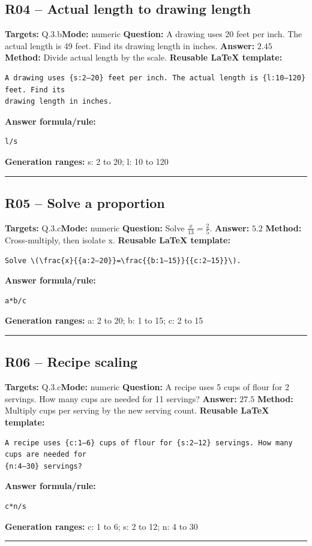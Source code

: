\documentclass[11pt]{article}
\begin{document}
\subsection{R04 -- Actual length to drawing length}
\textbf{Targets:} Q.3.b\quad\textbf{Mode:} numeric
\textbf{Question:} A drawing uses 20 feet per inch. The actual length is 49 feet. Find its drawing length in inches.
\textbf{Answer:} \(2.45\)
\textbf{Method:} Divide actual length by the scale.
\textbf{Reusable LaTeX template:}
\begin{verbatim}
A drawing uses {s:2–20} feet per inch. The actual length is {l:10–120} feet. Find its
drawing length in inches.
\end{verbatim}
\textbf{Answer formula/rule:}
\begin{verbatim}
l/s
\end{verbatim}
\textbf{Generation ranges:} s: 2 to 20; l: 10 to 120
\medskip\hrule\medskip
\subsection{R05 -- Solve a proportion}
\textbf{Targets:} Q.3.c\quad\textbf{Mode:} numeric
\textbf{Question:} Solve \(\frac{x}{13}=\frac{2}{5}\).
\textbf{Answer:} \(5.2\)
\textbf{Method:} Cross-multiply, then isolate x.
\textbf{Reusable LaTeX template:}
\begin{verbatim}
Solve \(\frac{x}{{a:2–20}}=\frac{{b:1–15}}{{c:2–15}}\).
\end{verbatim}
\textbf{Answer formula/rule:}
\begin{verbatim}
a*b/c
\end{verbatim}
\textbf{Generation ranges:} a: 2 to 20; b: 1 to 15; c: 2 to 15
\medskip\hrule\medskip
\subsection{R06 -- Recipe scaling}
\textbf{Targets:} Q.3.c\quad\textbf{Mode:} numeric
\textbf{Question:} A recipe uses 5 cups of flour for 2 servings. How many cups are needed for 11 servings?
\textbf{Answer:} \(27.5\)
\textbf{Method:} Multiply cups per serving by the new serving count.
\textbf{Reusable LaTeX template:}
\begin{verbatim}
A recipe uses {c:1–6} cups of flour for {s:2–12} servings. How many cups are needed for
{n:4–30} servings?
\end{verbatim}
\textbf{Answer formula/rule:}
\begin{verbatim}
c*n/s
\end{verbatim}
\textbf{Generation ranges:} c: 1 to 6; s: 2 to 12; n: 4 to 30
\medskip\hrule\medskip
\end{document}
